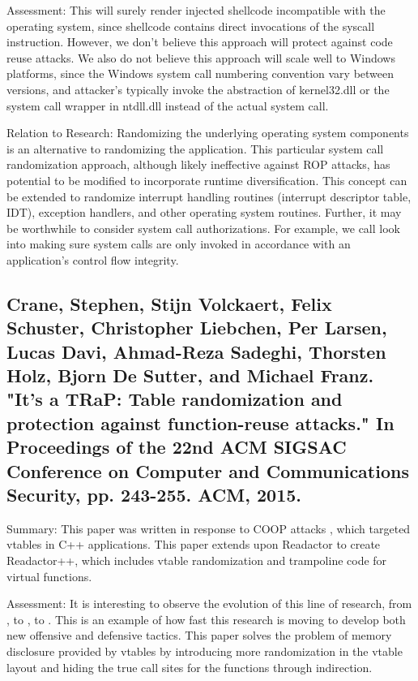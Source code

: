 \documentclass[preprint,12pt]{elsarticle}
\begin{document}
Assessment: This will surely render injected shellcode incompatible with the operating system, since shellcode contains direct invocations of the syscall instruction. However, we don't believe this approach will protect against code reuse attacks. We also do not believe this approach will scale well to Windows platforms, since the Windows system call numbering convention vary between versions, and attacker's typically invoke the abstraction of kernel32.dll or the system call wrapper in ntdll.dll instead of the actual system call. 

Relation to Research: Randomizing the underlying operating system components is an alternative to randomizing the application. This particular system call randomization approach, although likely ineffective against ROP attacks, has potential to be modified to incorporate runtime diversification. This concept can be extended to randomize interrupt handling routines (interrupt descriptor table, IDT), exception handlers, and other operating system routines. Further, it may be worthwhile to consider system call authorizations. For example, we call look into making sure system calls are only invoked in accordance with an application's control flow integrity.

\subsection{
\cite{crane2015s} Crane, Stephen, Stijn Volckaert, Felix Schuster, Christopher Liebchen, Per Larsen, Lucas Davi, Ahmad-Reza Sadeghi, Thorsten Holz, Bjorn De Sutter, and Michael Franz. "It's a TRaP: Table randomization and protection against function-reuse attacks." In Proceedings of the 22nd ACM SIGSAC Conference on Computer and Communications Security, pp. 243-255. ACM, 2015.
}

Summary: This paper was written in response to COOP attacks \cite{schuster2015counterfeit}, which targeted vtables in C++ applications. This paper extends upon Readactor \cite{crane2015readactor} to create Readactor++, which includes vtable randomization and trampoline code for virtual functions.

Assessment: It is interesting to observe the evolution of this line of research, from \cite{crane2015readactor}, to \cite{schuster2015counterfeit}, to \cite{crane2015s}. This is an example of how fast this research is moving to develop both new offensive and defensive tactics. This paper solves the problem of memory disclosure provided by vtables by introducing more randomization in the vtable layout and hiding the true call sites for the functions through indirection.
\end{document}
